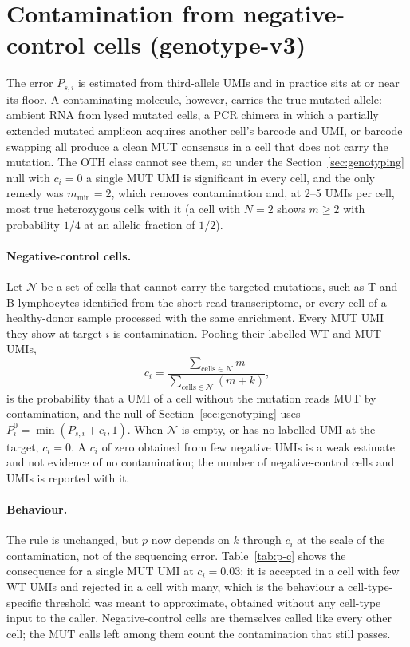 \documentclass[11pt]{article}
\begin{document}
\section{Contamination from negative-control cells (genotype-v3)}
\label{sec:contamination}

The error $P_{s,i}$ is estimated from third-allele UMIs and in practice sits at or near its floor. A contaminating molecule, however, carries the true mutated allele: ambient RNA from lysed mutated cells, a PCR chimera in which a partially extended mutated amplicon acquires another cell's barcode and UMI, or barcode swapping all produce a clean MUT consensus in a cell that does not carry the mutation. The OTH class cannot see them, so under the Section~\ref{sec:genotyping} null with $c_i=0$ a single MUT UMI is significant in every cell, and the only remedy was $m_{\min}=2$, which removes contamination and, at 2--5 UMIs per cell, most true heterozygous cells with it (a cell with $N=2$ shows $m\geq2$ with probability $1/4$ at an allelic fraction of $1/2$).

\paragraph{Negative-control cells.} Let $\mathcal{N}$ be a set of cells that cannot carry the targeted mutations, such as T and B lymphocytes identified from the short-read transcriptome, or every cell of a healthy-donor sample processed with the same enrichment. Every MUT UMI they show at target $i$ is contamination. Pooling their labelled WT and MUT UMIs,
\begin{equation}
c_i = \frac{\sum_{\text{cells} \in \mathcal{N}} m}{\sum_{\text{cells} \in \mathcal{N}} (m + k)},
\end{equation}
is the probability that a UMI of a cell without the mutation reads MUT by contamination, and the null of Section~\ref{sec:genotyping} uses $P^{0}_i = \min(P_{s,i} + c_i, 1)$. When $\mathcal{N}$ is empty, or has no labelled UMI at the target, $c_i = 0$. A $c_i$ of zero obtained from few negative UMIs is a weak estimate and not evidence of no contamination; the number of negative-control cells and UMIs is reported with it.

\paragraph{Behaviour.} The rule is unchanged, but $p$ now depends on $k$ through $c_i$ at the scale of the contamination, not of the sequencing error. Table~\ref{tab:p-c} shows the consequence for a single MUT UMI at $c_i = 0.03$: it is accepted in a cell with few WT UMIs and rejected in a cell with many, which is the behaviour a cell-type-specific threshold was meant to approximate, obtained without any cell-type input to the caller. Negative-control cells are themselves called like every other cell; the MUT calls left among them count the contamination that still passes.
\end{document}
